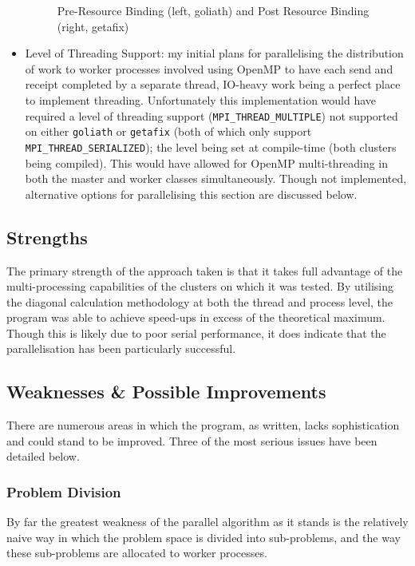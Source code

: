 \begin{itemize}
\begin{figure}[H]
    \caption{Pre-Resource Binding (left, goliath) and Post Resource Binding (right, getafix)}
    \label{fig:resource-binding}
    \end{figure}
    \item Level of Threading Support: my initial plans for parallelising the distribution of work to worker processes involved using OpenMP to have each send and receipt completed by a separate thread, IO-heavy work being a perfect place to implement threading. Unfortunately this implementation would have required a level of threading support (\lstinline{MPI_THREAD_MULTIPLE}) not supported on either \lstinline{goliath} or \lstinline{getafix} (both of which only support \lstinline{MPI_THREAD_SERIALIZED}); the level being set at compile-time (both clusters being compiled). This would have allowed for OpenMP multi-threading in both the master and worker classes simultaneously. Though not implemented, alternative options for parallelising this section are discussed below.
\end{itemize}

\subsection{Strengths}

The primary strength of the approach taken is that it takes full advantage of the multi-processing capabilities of the clusters on which it was tested. By utilising the diagonal calculation methodology at both the thread and process level, the program was able to achieve speed-ups in excess of the theoretical maximum. Though this is likely due to poor serial performance, it does indicate that the parallelisation has been particularly successful.

\subsection{Weaknesses \& Possible Improvements}

There are numerous areas in which the program, as written, lacks sophistication and could stand to be improved. Three of the most serious issues have been detailed below.

\subsubsection{Problem Division}
By far the greatest weakness of the parallel algorithm as it stands is the relatively naive way in which the problem space is divided into sub-problems, and the way these sub-problems are allocated to worker processes.

